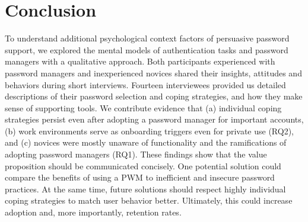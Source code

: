 

\section{Conclusion}
To understand additional psychological context factors of persuasive password support, we explored the mental models of authentication tasks and password managers with a qualitative approach. Both participants experienced with password managers and inexperienced novices shared their insights, attitudes and behaviors during short interviews. Fourteen interviewees provided us detailed descriptions of their password selection and coping strategies, and how they make sense of supporting tools. 
We contribute evidence that (a) individual coping strategies persist even after adopting a password manager for important accounts, (b) work environments serve as onboarding triggers even for private use (RQ2), and (c) novices were mostly unaware of functionality and the ramifications of adopting password managers (RQ1). 
These findings show that the value proposition should be communicated concisely. One potential solution could compare the benefits of using a PWM to inefficient and insecure password practices. At the same time, future solutions should respect highly individual coping strategies to match user behavior better. Ultimately, this could increase adoption and, more importantly, retention rates. 

